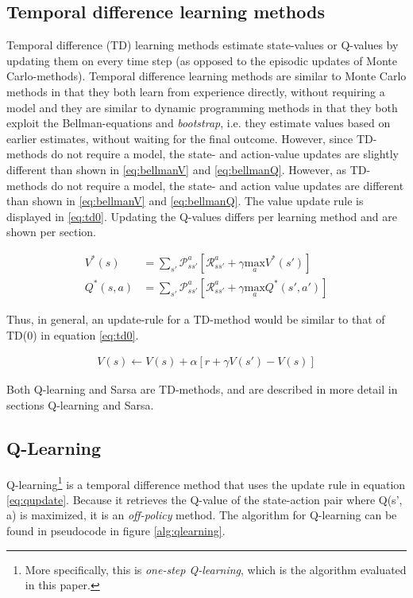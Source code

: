 \documentclass{article}
\begin{document}
\subsection{Temporal difference learning methods}
Temporal difference (TD) learning methods estimate state-values or Q-values by updating them on every time step (as opposed to the episodic updates of Monte Carlo-methods).
Temporal difference learning methods are similar to Monte Carlo methods in that they both learn from experience directly, without requiring a model and they are similar to dynamic programming methods in that they both exploit the Bellman-equations and \textit{bootstrap}, i.e. they estimate values based on earlier estimates, without waiting for the final outcome. However, since TD-methods do not require a model, the state- and action-value updates are slightly different than shown in \ref{eq:bellmanV} and \ref{eq:bellmanQ}. However, as TD-methods do not require a model, the state- and action value updates are different than shown in \ref{eq:bellmanV} and \ref{eq:bellmanQ}. The value update rule is displayed in \ref{eq:td0}. Updating the Q-values differs per learning method and are shown per section.
\begin{mdframed}
\begin{align}
V^*(s) &= \sum_{s'} \mathcal{P}^a_{ss'}\left[ \mathcal{R}^a_{ss'} + \gamma \underset{a}{\text{max}}V^*(s') \right]\label{eq:bellmanV}\\
Q^*(s,a) &= \sum_{s'} \mathcal{P}^a_{ss'}\left[ \mathcal{R}^a_{ss'} + \gamma \underset{a}{\text{max}}Q^*(s', a') \right]\label{eq:bellmanQ}
\end{align}
\end{mdframed}

Thus, in general, an update-rule for a TD-method would be similar to that of TD(0) in equation \ref{eq:td0}.
\begin{mdframed}
\begin{align}
V(s) \leftarrow V(s) + \alpha [r+\gamma V(s') - V(s)]\label{eq:td0}
\end{align}
\end{mdframed}
Both Q-learning and Sarsa are TD-methods, and are described in more detail in sections Q-learning and Sarsa.

\subsection{Q-Learning} 
Q-learning\footnote{More specifically, this is \textit{one-step Q-learning}, which is the algorithm evaluated in this paper.} is a temporal difference method that uses the update rule in equation \ref{eq:qupdate}. Because it retrieves the Q-value of the state-action pair where Q(s', a) is maximized, it is an \textit{off-policy} method. The algorithm for Q-learning can be found in pseudocode in figure \ref{alg:qlearning}.
\end{document}

